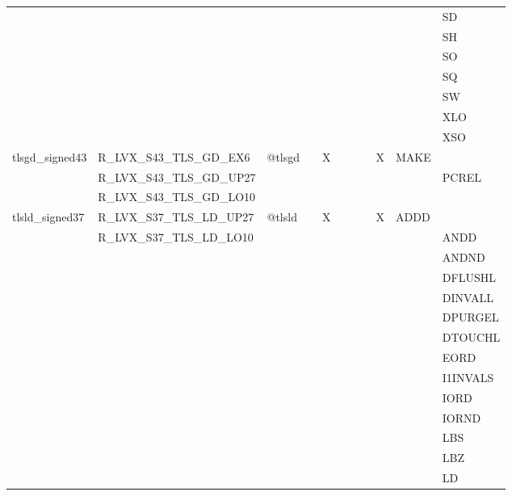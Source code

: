 {\begin{tabular}{|l|l|l|l|l|l|l|l|l|l|l|}
 & & & & & & & & & & \textsf{SD} \\
 & & & & & & & & & & \textsf{SH} \\
 & & & & & & & & & & \textsf{SO} \\
 & & & & & & & & & & \textsf{SQ} \\
 & & & & & & & & & & \textsf{SW} \\
 & & & & & & & & & & \textsf{XLO} \\
 & & & & & & & & & & \textsf{XSO} \\
\hline
\textsf{tlsgd\_signed43} & \textsf{R\_LVX\_S43\_TLS\_GD\_EX6} & \textsf{@tlsgd} & \textsf{} & \textsf{X} & \textsf{} & \textsf{} & \textsf{} & \textsf{X} & \textsf{MAKE} \\
 & \textsf{R\_LVX\_S43\_TLS\_GD\_UP27} & & & & & & & & & \textsf{PCREL} \\
 & \textsf{R\_LVX\_S43\_TLS\_GD\_LO10} & & & & & & & & & \\
\hline
\textsf{tlsld\_signed37} & \textsf{R\_LVX\_S37\_TLS\_LD\_UP27} & \textsf{@tlsld} & \textsf{} & \textsf{X} & \textsf{} & \textsf{} & \textsf{} & \textsf{X} & \textsf{ADDD} \\
 & \textsf{R\_LVX\_S37\_TLS\_LD\_LO10} & & & & & & & & & \textsf{ANDD} \\
 & & & & & & & & & & \textsf{ANDND} \\
 & & & & & & & & & & \textsf{DFLUSHL} \\
 & & & & & & & & & & \textsf{DINVALL} \\
 & & & & & & & & & & \textsf{DPURGEL} \\
 & & & & & & & & & & \textsf{DTOUCHL} \\
 & & & & & & & & & & \textsf{EORD} \\
 & & & & & & & & & & \textsf{I1INVALS} \\
 & & & & & & & & & & \textsf{IORD} \\
 & & & & & & & & & & \textsf{IORND} \\
 & & & & & & & & & & \textsf{LBS} \\
 & & & & & & & & & & \textsf{LBZ} \\
 & & & & & & & & & & \textsf{LD} \\
\hline\end{tabular}
}
\smallskip

